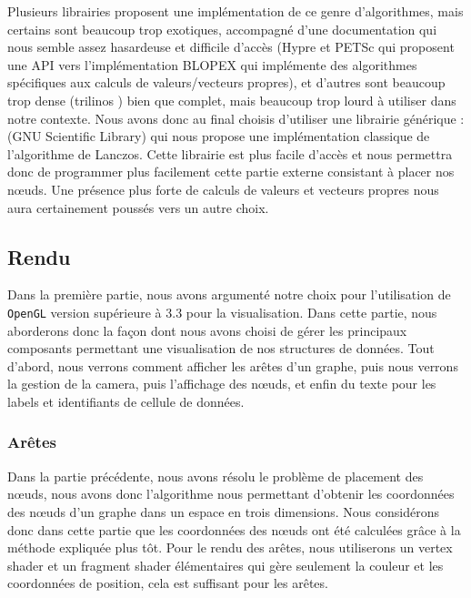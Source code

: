 \documentclass[a4paper, 11pt]{article}
\begin{document}
Plusieurs librairies proposent une implémentation de ce genre d'algorithmes, mais certains sont beaucoup trop exotiques, accompagné d'une documentation qui nous semble assez hasardeuse et difficile d'accès (Hypre et PETSc qui proposent une API vers l'implémentation BLOPEX \cite{BLOPEX} qui implémente des algorithmes spécifiques aux calculs de valeurs/vecteurs propres), et d'autres sont beaucoup trop dense (trilinos \cite{TRILINOS}) bien que complet, mais beaucoup trop lourd à utiliser dans notre contexte. Nous avons donc au final choisis d'utiliser une librairie générique : \cite{GSL} (GNU Scientific Library) qui nous propose une implémentation classique de l'algorithme de Lanczos. Cette librairie est plus facile d'accès et nous permettra donc de programmer plus facilement cette partie externe consistant à placer nos nœuds. Une présence plus forte de calculs de valeurs et vecteurs propres nous aura certainement poussés vers un autre choix.

\subsection{Rendu}

Dans la première partie, nous avons argumenté notre choix pour l'utilisation de \texttt{OpenGL} version supérieure à 3.3 pour la visualisation. Dans cette partie, nous aborderons donc la façon dont nous avons choisi de gérer les principaux composants permettant une visualisation de nos structures de données. Tout d'abord, nous verrons comment afficher les arêtes d'un graphe, puis nous verrons la gestion de la camera, puis l'affichage des nœuds, et enfin du texte pour les labels et identifiants de cellule de données.

\subsubsection{Arêtes}

Dans la partie précédente, nous avons résolu le problème de placement des nœuds, nous avons donc l'algorithme nous permettant d'obtenir les coordonnées des nœuds d'un graphe dans un espace en trois dimensions. Nous considérons donc dans cette partie que les coordonnées des nœuds ont été calculées grâce à la méthode expliquée plus tôt. Pour le rendu des arêtes, nous utiliserons un vertex shader et un fragment shader élémentaires qui gère seulement la couleur et les coordonnées de position, cela est suffisant pour les arêtes.
\end{document}
